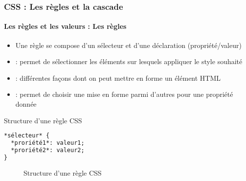 \documentclass[xcolor=table]{beamer}
\begin{document}
\begin{frame}[fragile]
\frametitle{CSS : Les règles et la cascade}
\framesubtitle{Les règles et les valeurs : Les règles}

\begin{minipage}{0.60\textwidth} 
\begin{itemize}
	\item Une règle se compose d'un sélecteur et d'une déclaration (propriété/valeur)
	\item {} : permet de sélectionner les éléments sur lesquels appliquer le style souhaité
	\item {} : différentes façons dont on peut mettre en forme un élément HTML
	\item {} : permet de choisir une mise en forme parmi d'autres pour une propriété donnée
\end{itemize}
\end{minipage}
%
\begin{minipage}{0.38\textwidth}
\begin{exampleblock}{Structure d'une règle CSS}
\lstset{escapeinside=**}
\scriptsize\bfseries
\begin{lstlisting}[language={html}]
*sélecteur* {
  *proriété1*: valeur1;
  *proriété2*: valeur2;
}
\end{lstlisting}
\end{exampleblock}
\begin{figure}
	\centering
	\caption{Structure d'une règle CSS \cite{mdn}}
\end{figure}
\end{minipage}

\end{frame}
\end{document}
